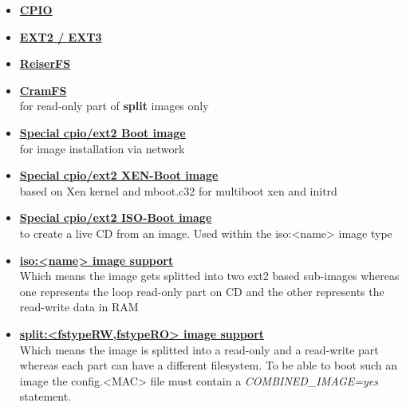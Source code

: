 \begin{itemize}
	\item \textbf{\underline{CPIO}}
	\item \textbf{\underline{EXT2 / EXT3}}
	\item \textbf{\underline{ReiserFS}}
	\item \textbf{\underline{CramFS}}\\
		  for read-only part of \textbf{split} images only
	\item \textbf{\underline{Special cpio/ext2 Boot image}}\\
          for image installation via network
	\item \textbf{\underline{Special cpio/ext2 XEN-Boot image}}\\
          based on Xen kernel
          and mboot.c32 for multiboot xen and initrd
	\item \textbf{\underline{Special cpio/ext2 ISO-Boot image}}\\
          to create a live CD from
          an image. Used within the iso:<name> image type 
	\item \textbf{\underline{iso:<name> image support}}\\
          Which means the image gets
          splitted into two ext2 based sub-images whereas one represents
          the loop read-only part on CD and the other represents the
          read-write data in RAM
	\item \textbf{\underline{split:<fstypeRW,fstypeRO> image support}}\\
          Which means the image is splitted into a read-only and a
          read-write part whereas each part can have a different
          filesystem. To be able to boot such an image the config.<MAC>
          file must contain a \textit{COMBINED\_IMAGE=yes} statement.
\end{itemize}
